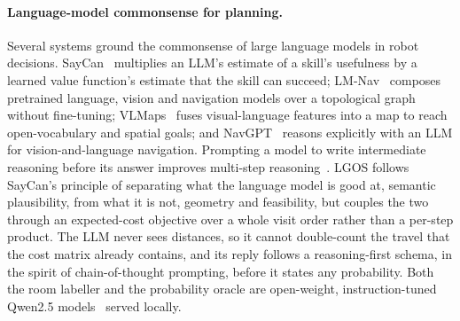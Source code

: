 \documentclass[10pt]{article}
\newcommand{\ours}{LGOS\xspace}
\begin{document}
\paragraph{Language-model commonsense for planning.}
Several systems ground the commonsense of large language models in robot decisions.
SayCan~\citep{ichter2023do} multiplies an LLM's estimate of a skill's usefulness by a learned value
function's estimate that the skill can succeed; LM-Nav~\citep{shah2022lm} composes pretrained
language, vision and navigation models over a topological graph without fine-tuning;
VLMaps~\citep{huang2023visual} fuses visual-language features into a map to reach open-vocabulary and
spatial goals; and NavGPT~\citep{zhou2024navgpt} reasons explicitly with an LLM for vision-and-language
navigation. Prompting a model to write intermediate reasoning before its answer improves multi-step
reasoning~\citep{wei2022chain}. \ours follows SayCan's principle of separating what the language model is
good at, semantic plausibility, from what it is not, geometry and feasibility, but couples the two
through an expected-cost objective over a whole visit order rather than a per-step product. The LLM never
sees distances, so it cannot double-count the travel that the cost matrix already contains, and its reply
follows a reasoning-first schema, in the spirit of chain-of-thought prompting, before it states any
probability. Both the room labeller and the probability oracle are open-weight, instruction-tuned Qwen2.5
models~\citep{yang2024qwen25} served locally.
\end{document}
